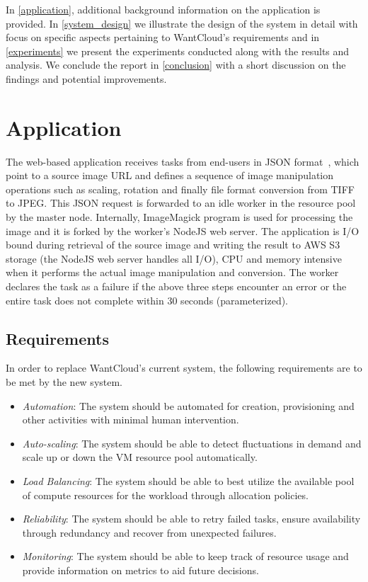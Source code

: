 \documentclass[a4paper]{IEEEtran}
\begin{document}
In \autoref{application}, additional background information on the application is provided. In \autoref{system_design} we illustrate the design of the system in detail with focus on specific aspects pertaining to
WantCloud's requirements and in \autoref{experiments} we present the experiments conducted along with the
results and analysis. We conclude the report in \autoref{conclusion} with a short discussion on the findings and potential improvements.

\section{Application} \label{application}

The web-based application receives tasks from end-users in JSON format~\cite{rfc7159}, which point to a source image URL and defines a sequence of image manipulation operations such as scaling, rotation and finally file format conversion from TIFF to JPEG. This JSON request is forwarded to an idle worker in the resource pool by the master node. Internally, ImageMagick program is used for processing the image and it is forked by the worker's NodeJS web server. The application is I/O bound during retrieval of the source image and writing the result to AWS S3 storage (the NodeJS web server handles all I/O), CPU and memory intensive when it performs the actual image manipulation and conversion. The worker declares the task as a failure if the above three steps encounter an error or the entire 
task does not complete within 30 seconds (parameterized).

\subsection{Requirements}

In order to replace WantCloud's current system, the following requirements are to be met by the new system.

\begin{itemize}
  \item \emph{Automation}: The system should be automated for creation, provisioning and other activities
  with minimal human intervention.
  \item \emph{Auto-scaling}: The system should be able to detect fluctuations in demand and scale up or down the VM resource pool automatically.
  \item \emph{Load Balancing}: The system should be able to best utilize the available pool of compute resources
  for the workload through allocation policies.
  \item \emph{Reliability}: The system should be able to retry failed tasks, ensure availability through redundancy and recover from unexpected failures.
  \item \emph{Monitoring}: The system should be able to keep track of resource usage and provide information
  on metrics to aid future decisions.
\end{itemize}
\end{document}
